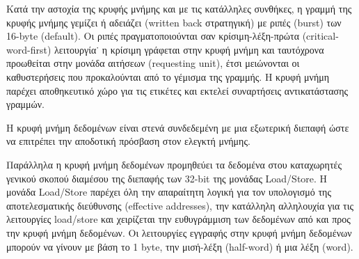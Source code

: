 \documentclass[a4paper,10pt]{article}
\numberwithin{figure}{section}
\numberwithin{table}{section}
\begin{document}
Κατά την αστοχία της κρυφής μνήμης και με τις κατάλληλες συνθήκες, η γραμμή της κρυφής μνήμης
γεμίζει ή αδειάζει (written back στρατηγική) με ριπές (burst) των 16-byte (default). Οι ριπές πραγματοποιούνται
σαν κρίσιμη-λέξη-πρώτα (critical-word-first) λειτουργία˙ η κρίσιμη γράφεται στην κρυφή μνήμη
και ταυτόχρονα προωθείται στην μονάδα αιτήσεων (requesting unit), έτσι μειώνονται οι καθυστερήσεις
που προκαλούνται από το γέμισμα της γραμμής. Η κρυφή μνήμη παρέχει αποθηκευτικό χώρο για τις
ετικέτες και εκτελεί συναρτήσεις αντικατάστασης γραμμών.
\newline

Η κρυφή μνήμη δεδομένων είναι στενά συνδεδεμένη με μια εξωτερική διεπαφή ώστε να επιτρέπει την αποδοτική
πρόσβαση στον ελεγκτή μνήμης.
\newline

Παράλληλα η κρυφή μνήμη δεδομένων προμηθεύει τα δεδομένα στου καταχωρητές γενικού σκοπού διαμέσου
της διεπαφής των 32-bit της μονάδας Load/Store. Η μονάδα Load/Store παρέχει όλη την απαραίτητη λογική για
τον υπολογισμό της αποτελεσματικής διεύθυνσης (effective addresses), την κατάλληλη αλληλουχία
για τις λειτουργίες load/store και χειρίζεται την ευθυγράμμιση των δεδομένων από και 
προς την κρυφή μνήμη δεδομένων. Οι λειτουργίες εγγραφής στην κρυφή μνήμη δεδομένων μπορούν
να γίνουν με βάση το 1 byte, την μισή-λέξη (half-word) ή μια λέξη (word).
\end{document}
